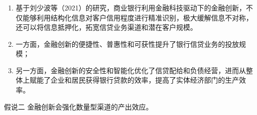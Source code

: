 \documentclass[12pt,aspectratio=169]{ctexbeamer}
\begin{document}
			\begin{frame}
				\frametitle{}
				\begin{enumerate}
					\justifying
					\normalsize
					\item 基于刘少波等（2021）的研究，商业银行利用金融科技驱动下的金融创新，不仅能够利用结构化信息对客户信用程度进行精准识别，极大缓解信息不对称，还可以将信息抵押化，拓宽信贷业务渠道和潜在客户规模。
					\item 一方面，金融创新的便捷性、普惠性和可获性提升了银行信贷业务的投放规模；
					\item 另一方面，金融创新的安全性和智能化优化了信贷配给和负债经营，进而从整体上赋能了企业和居民获得银行贷款的效率，提高了实体经济部门的生产效率。
				\end{enumerate}
				\centering
				\begin{minipage}{0.7\textwidth}
					\begin{block}{假说二}
						\fangsong 
						\justifying
						\hspace{2em}
						金融创新会强化数量型渠道的产出效应。
					\end{block}
				\end{minipage}
			\end{frame}
\end{document}

